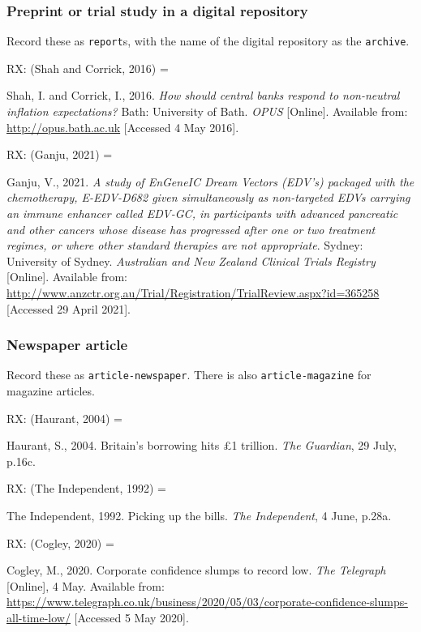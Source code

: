 \subsubsection*{Preprint or trial study in a digital repository}

Record these as \texttt{report}s, with the name of the digital repository as the \texttt{archive}.

RX: (Shah and Corrick, 2016) = \cite{shah.corrick2016hsc}

Shah, I. and Corrick, I., 2016. \emph{How should central banks respond to non-neutral inflation expectations?} Bath: University of Bath. \emph{OPUS} [Online]. Available from: \url{http://opus.bath.ac.uk} [Accessed 4 May 2016].


RX: (Ganju, 2021) = \cite{ganju2021sed}

Ganju, V., 2021. \emph{A study of EnGeneIC Dream Vectors (EDV's) packaged with the chemotherapy, E-EDV-D682 given simultaneously as non-targeted EDVs carrying an immune enhancer called EDV-GC, in participants with advanced pancreatic and other cancers whose disease has progressed after one or two treatment regimes, or where other standard therapies are not appropriate}. Sydney: University of Sydney. \emph{Australian and New Zealand Clinical Trials Registry} [Online]. Available from: \url{http://www.anzctr.org.au/Trial/Registration/TrialReview.aspx?id=365258} [Accessed 29 April 2021].



\subsubsection*{Newspaper article}

Record these as \texttt{article-newspaper}. There is also \texttt{article-magazine} for magazine articles.

RX: (Haurant, 2004) = \cite{haurant2004bbh}

Haurant, S., 2004. Britain's borrowing hits £1 trillion. \emph{The Guardian}, 29 July, p.16c.


RX: (The Independent, 1992) = \cite{independent1992pub}

The Independent, 1992. Picking up the bills. \emph{The Independent}, 4 June, p.28a.


RX: (Cogley, 2020) = \cite{cogley2020ccs}

Cogley, M., 2020. Corporate confidence slumps to record low. \emph{The Telegraph} [Online], 4 May. Available from: \url{https://www.telegraph.co.uk/business/2020/05/03/corporate-confidence-slumps-all-time-low/} [Accessed 5 May 2020].



